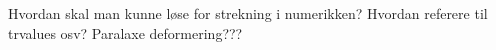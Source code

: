 Hvordan skal man kunne løse for strekning i numerikken?
Hvordan referere til trvalues osv?
Paralaxe deformering???
